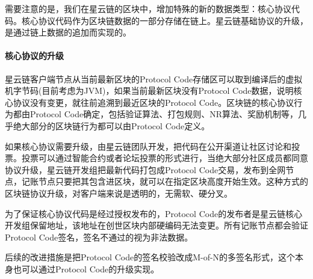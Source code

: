 需要注意的是，我们在星云链的区块中，增加特殊的新的数据类型：核心协议代码。核心协议代码作为区块链数据的一部分存储在链上。星云链基础协议的升级，是通过链上数据的追加而实现的。

\paragraph{核心协议的升级}

星云链客户端节点从当前最新区块的Protocol Code存储区可以取到编译后的虚拟机字节码(目前考虑为JVM)，如果当前最新区块没有Protocol Code数据，说明核心协议没有变更，就往前追溯到最近区块的Protocol Code。区块链的核心协议行为都由Protocol Code确定，包括验证算法、打包规则、NR算法、奖励机制等，几乎绝大部分的区块链行为都可以由Protocol Code定义。

如果核心协议需要升级，由星云链团队开发，把代码在公开渠道让社区讨论和投票。投票可以通过智能合约或者论坛投票的形式进行，当绝大部分社区成员都同意协议升级，星云链开发组把最新代码打包成Protocol Code交易，发布到全网节点，记账节点只要把其包含进区块，就可以在指定区块高度开始生效。这种方式的区块链协议升级，对客户端来说是透明的，无需软、硬分叉。

为了保证核心协议代码是经过授权发布的，Protocol Code的发布者是星云链核心开发组保留地址，该地址在创世区块内部硬编码无法变更。所有记账节点都会验证Protocol Code签名，签名不通过的视为非法数据。

后续的改进措施是把Protocol Code的签名校验改成M-of-N的多签名形式，这个本身也可以通过Protocol Code的升级实现。
